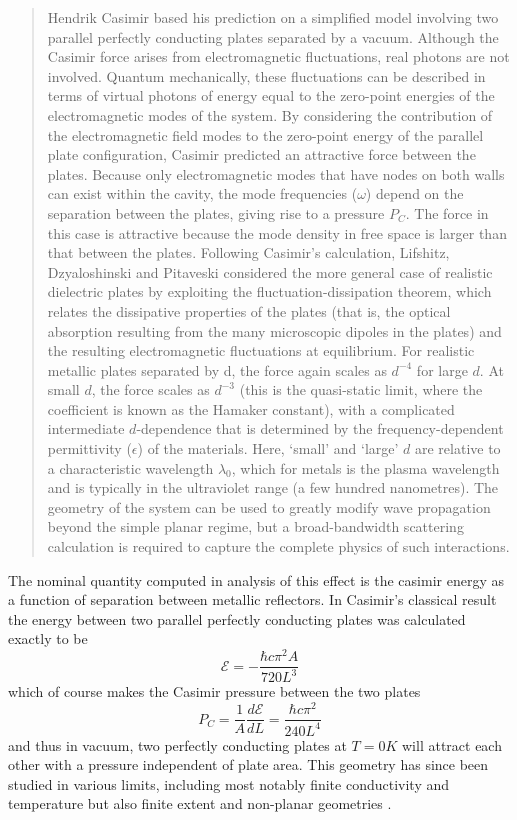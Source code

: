 \documentclass[11pt,traditabstract]{article}
\newcommand{\E}{\mathcal{E}}
\begin{document}
\begin{quote}
Hendrik Casimir based his prediction on a simplified model involving two parallel perfectly conducting plates separated by a vacuum. Although the Casimir force arises from electromagnetic fluctuations, real photons are not involved. Quantum mechanically, these fluctuations can be described in terms of virtual photons of energy equal to the zero-point energies of the electromagnetic modes of the system. By considering the contribution of the electromagnetic field modes to the zero-point energy of the parallel plate configuration, Casimir predicted an attractive force between the plates. Because only electromagnetic modes that have nodes on both walls can exist within the cavity, the mode frequencies ($\omega$) depend on the separation between the plates, giving rise to a pressure $P_C$. The force in this case is attractive because the mode density in free space is larger than that between the plates. Following Casimir's calculation, Lifshitz, Dzyaloshinski and Pitaveski considered the more general case of realistic dielectric plates by exploiting the fluctuation-dissipation theorem, which relates the dissipative properties of the plates (that is, the optical absorption resulting from the many microscopic dipoles in the plates) and the resulting electromagnetic fluctuations at equilibrium. For realistic metallic plates separated by d, the force again scales as $d^{-4}$ for large $d.$ At small $d$, the force scales as $d^{-3}$ (this is the quasi-static limit, where the coefficient is known as the Hamaker constant), with a complicated intermediate $d$-dependence that is determined by the frequency-dependent permittivity ($\epsilon$) of the materials. Here, `small' and `large' $d$ are relative to a characteristic wavelength $\lambda_0$, which for metals is the plasma wavelength and is typically in the ultraviolet range (a few hundred nanometres). The geometry of the system can be used to greatly modify wave propagation beyond the simple planar regime, but a broad-bandwidth scattering calculation is required to capture the complete physics of such interactions.
\end{quote}

The nominal quantity computed in analysis of this effect is the casimir energy as a function of separation between metallic reflectors. In Casimir's classical result \citep{Casimir} the energy between two parallel perfectly conducting plates was calculated exactly to be \citep[given in nice form by][]{ScatteringTheory}
$$
\E=-\frac{\hbar c\pi^2A}{720L^3}
$$
which of course makes the Casimir pressure between the two plates
$$
P_C=\frac{1}{A}\frac{d\E}{dL}=\frac{\hbar c\pi^2}{240L^4}
$$
and thus in vacuum, two perfectly conducting plates at $T=0K$ will attract each other with a pressure independent of plate area. This geometry has since been studied in various limits, including most notably finite conductivity and temperature \citep[][ and references therein]{ScatteringTheory} but also finite extent and non-planar geometries \citep[][ and references therein]{Rahi}.
\end{document}
